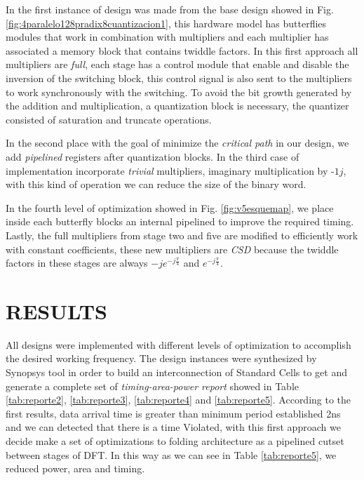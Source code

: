 \documentclass[journal,comsoc]{IEEEtran}
\begin{document}
In the first instance of design was made from the base design showed in Fig. \ref{fig:4paralelo128pradix8cuantizacion1}, this hardware model has butterflies modules that work in combination with multipliers and each multiplier has associated a memory block that contains twiddle factors. In this first approach all multipliers are \textit{full}, each stage has a control module that enable and disable the inversion of the switching block, this control signal is also sent to the multipliers to work synchronously with the switching. To avoid the bit growth generated by the addition and multiplication, a quantization block is necessary, the quantizer consisted of saturation and truncate operations.

In the second place with the goal of minimize the \textit{critical path} in our design, we add \textit{pipelined} registers after quantization blocks. In the third case of implementation incorporate \textit{trivial} multipliers, imaginary multiplication by -$1j$, with this kind of operation we can reduce the size of the binary word. 

In the fourth level of optimization showed in Fig. \ref{fig:v5esquemap}, we place inside each butterfly blocks an internal pipelined to improve the required timing. Lastly, the full multipliers from stage two and five are modified to efficiently work with constant coefficients, these new multipliers are \textit{CSD} because the twiddle factors in these stages are always $-je^{-j\frac{\pi}{4}}$ and $e^{-j\frac{\pi}{4}}$.


\section{RESULTS}
All designs were implemented with different levels of optimization to accomplish the desired working frequency. The design instances were synthesized by Synopsys tool in order to build an interconnection of Standard Cells to get and generate a complete set of \textit{timing-area-power report} showed in Table \ref{tab:reporte2}, \ref{tab:reporte3}, \ref{tab:reporte4} and  \ref{tab:reporte5}. According to the first results, data arrival time is greater than minimum period established 2ns and we can detected that there is a time Violated, with this first approach we decide make a set of optimizations to folding architecture as a pipelined cutset between stages of DFT. In this way as we can see in Table \ref{tab:reporte5}, we reduced power, area and timing. 
\end{document}
